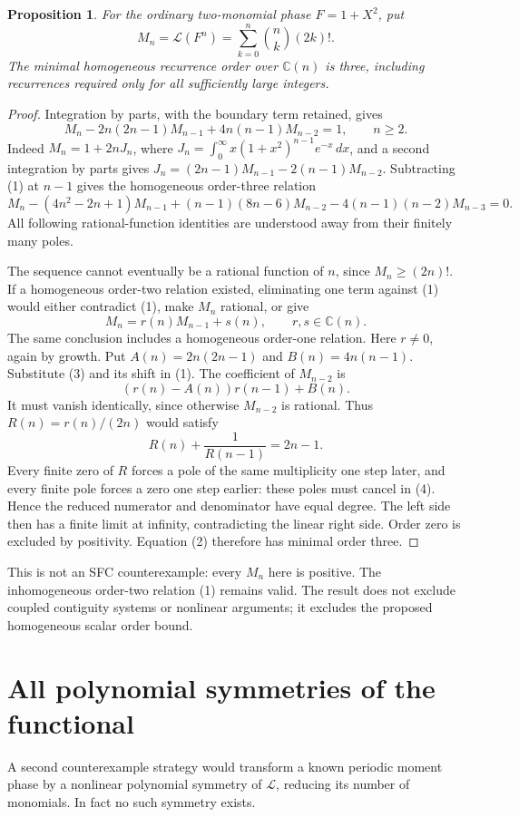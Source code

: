 \documentclass[11pt]{article}
\newtheorem{proposition}{Proposition}
\newcommand{\Lfac}{\mathcal L}
\newcommand{\C}{\mathbb C}
\begin{document}
\begin{proposition}\label{prop:recurrence}
For the ordinary two-monomial phase $F=1+X^2$, put
\[
 M_n=\Lfac(F^n)=\sum_{k=0}^n\binom nk(2k)!.
\]
The minimal homogeneous recurrence order over $\C(n)$ is three,
including recurrences required only for all sufficiently large integers.
\end{proposition}
\begin{proof}
Integration by parts, with the boundary term retained, gives
\[
 M_n-2n(2n-1)M_{n-1}+4n(n-1)M_{n-2}=1,\qquad n\geq2.       \tag{1}
\]
Indeed $M_n=1+2nJ_n$, where
$J_n=\int_0^\infty x(1+x^2)^{n-1}e^{-x}\,dx$, and a second integration
by parts gives
$J_n=(2n-1)M_{n-1}-2(n-1)M_{n-2}$.
Subtracting (1) at $n-1$ gives the homogeneous order-three relation
\[
 M_n-(4n^2-2n+1)M_{n-1}
 +(n-1)(8n-6)M_{n-2}
 -4(n-1)(n-2)M_{n-3}=0.                                \tag{2}
\]
All following rational-function identities are understood away from
their finitely many poles.

The sequence cannot eventually be a rational function of $n$, since
$M_n\geq(2n)!$. If a homogeneous order-two relation existed, eliminating
one term against (1) would either contradict (1), make $M_n$ rational,
or give
\[
 M_n=r(n)M_{n-1}+s(n),\qquad r,s\in\C(n).
                                                               \tag{3}
\]
The same conclusion includes a homogeneous order-one relation.
Here $r\ne0$, again by growth. Put
$A(n)=2n(2n-1)$ and $B(n)=4n(n-1)$. Substitute (3) and its shift in (1).
The coefficient of $M_{n-2}$ is
\[
 (r(n)-A(n))r(n-1)+B(n).
\]
It must vanish identically, since otherwise $M_{n-2}$ is rational.
Thus $R(n)=r(n)/(2n)$ would satisfy
\[
 R(n)+\frac1{R(n-1)}=2n-1.                              \tag{4}
\]
Every finite zero of $R$ forces a pole of the same multiplicity one
step later, and every finite pole forces a zero one step earlier:
these poles must cancel in (4). Hence the reduced numerator and
denominator have equal degree. The left side then has a finite limit
at infinity, contradicting the linear right side.
Order zero is excluded by positivity. Equation (2) therefore has
minimal order three.
\end{proof}

This is not an SFC counterexample: every $M_n$ here is positive.
The inhomogeneous order-two relation (1) remains valid. The result
does not exclude coupled contiguity systems or nonlinear arguments;
it excludes the proposed homogeneous scalar order bound.

\section{All polynomial symmetries of the functional}
A second counterexample strategy would transform a known periodic
moment phase by a nonlinear polynomial symmetry of $\Lfac$, reducing
its number of monomials. In fact no such symmetry exists.
\end{document}
